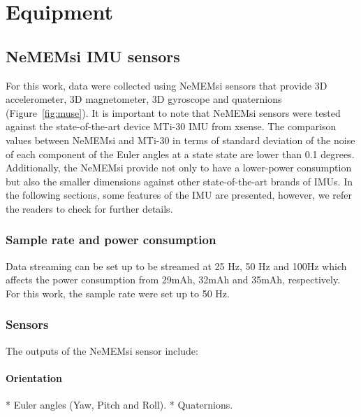 		\chapter{Equipment} \label{appendix:b}


\graphicspath{{figs/appendixB/PDF/}}


\section{NeMEMsi IMU sensors}  \label{appendix:imus}
For this work, data were collected using NeMEMsi sensors \cite{Comotti2014}
that provide 3D accelerometer, 3D magnetometer, 3D gyroscope and quaternions
(Figure~\ref{fig:muse}).
It is important to note that NeMEMsi sensors 
were tested against the state-of-the-art device MTi-30 IMU from xsense.
The comparison values between NeMEMsi and MTi-30 in terms of standard deviation 
of the noise of each component of the Euler angles at a state state are lower 
than 0.1 degrees. 
Additionally, the NeMEMsi provide not only to have a lower-power consumption 
but also the smaller dimensions against other state-of-the-art brands of IMUs.
In the following sections, some features of the IMU are presented,
however, we refer the readers to check \cite{Comotti2014} for further details.

\subsection*{Sample rate and power consumption}
Data streaming can be set up to be streamed at 25 Hz, 50 Hz and 100Hz which
affects the power consumption from 29mAh, 32mAh and 35mAh, respectively.
For this work, the sample rate were set up to 50 Hz.

\subsection*{Sensors}
The outputs of the NeMEMsi sensor include:

\subsubsection*{Orientation}
* Euler angles (Yaw, Pitch and Roll).
* Quaternions.

